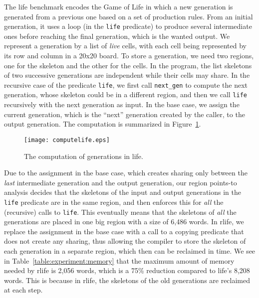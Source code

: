 \documentclass{tlp}
\newcommand{\bench}[1]{{#1}}
\newcommand{\code}[1]{{\tt#1}}
\begin{document}
The \bench{life} benchmark encodes the Game of Life
in which a new generation is generated from a previous one
based on a set of production rules.
From an initial generation,
it uses a loop (in the \code{life} predicate)
to produce several intermediate ones
before reaching the final generation, which is the wanted output.
We represent a generation by a list of \emph{live} cells,
with each cell being represented by its row and column in a 20x20 board.
To store a generation, we need two regions,
one for the skeleton and the other for the cells.
In the program,
the list skeletons of two successive generations are independent
while their cells may share.
In the recursive case of the predicate \code{life},
we first call \code{next\_gen} to compute the next generation,
whose skeleton could be in a different region,
and then we call \code{life} recursively
with the next generation as input.
In the base case,
we assign the current generation,
which is the ``next'' generation created by the caller,
to the output generation.
The computation is summarized in Figure~\ref{fig:life}.
\begin{figure}
\centering
\texttt{[image: computelife.eps]}
\caption{The computation of generations in \bench{life}.}
\label{fig:life}
\end{figure}
Due to the assignment in the base case,
which creates sharing only between
the \emph{last} intermediate generation and the output generation,
our region points-to analysis decides
that the skeletons of the input and output generations
in the \code{life} predicate are in the same region,
and then enforces this for \emph{all} the (recursive) calls to \code{life}.
This eventually means that the skeletons of \emph{all} the generations
are placed in one big region with a size of 6,486 words.
In \bench{rlife}, we replace the assignment in the base case
with a call to a copying predicate that does not create any sharing,
thus allowing the compiler
to store the skeleton of each generation in a separate region,
which then can be reclaimed in time.
We see in Table~\ref{table:experiment:memory} that
the maximum amount of memory needed by \bench{rlife} is 2,056 words,
which is a 75\% reduction compared to \bench{life}'s 8,208 words.
This is because in \bench{rlife},
the skeletons of the old generations are reclaimed at each step.
\end{document}
